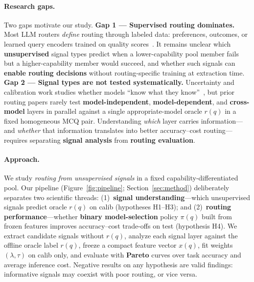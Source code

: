 \paragraph{Research gaps.}
Two gaps motivate our study.
\textbf{Gap 1 --- Supervised routing dominates.}
Most LLM routers \emph{define} routing through labeled data: preferences, outcomes, or learned query encoders trained on quality scores~\citep{ong2024routellm,ding2024hybrid,feng2025graphrouter,zhang2026agentrouter}.
It remains unclear which \textbf{unsupervised} signal types predict when a lower-capability pool member fails but a higher-capability member would succeed, and whether such signals can \textbf{enable routing decisions} without routing-specific training at extraction time.
\textbf{Gap 2 --- Signal types are not tested systematically.}
Uncertainty and calibration work studies whether models ``know what they know''~\citep{kadavath2022know,plaut2024calibration}, but prior routing papers rarely test \textbf{model-independent}, \textbf{model-dependent}, and \textbf{cross-model} layers in parallel against a single appropriate-model oracle $r(q)$ in a fixed homogeneous MCQ pair.
Understanding \emph{which} layer carries information---and \emph{whether} that information translates into better accuracy--cost routing---requires separating \textbf{signal analysis} from \textbf{routing evaluation}.

\paragraph{Approach.}
We study \emph{routing from unsupervised signals} in a fixed capability-differentiated pool.
Our pipeline (Figure~\ref{fig:pipeline}; Section~\ref{sec:method}) deliberately separates two scientific threads:
(1)~\textbf{signal understanding}---which unsupervised signals predict oracle $r(q)$ on calib (hypotheses H1--H3); and
(2)~\textbf{routing performance}---whether \textbf{binary model-selection} policy $\pi(q)$ built from frozen features improves accuracy--cost trade-offs on test (hypothesis H4).
We extract candidate signals without $r(q)$, analyze each signal layer against the offline oracle label $r(q)$, freeze a compact feature vector $x(q)$, fit weights $(\lambda,\tau)$ on calib only, and evaluate with \textbf{Pareto} curves over task accuracy and average inference cost.
Negative results on any hypothesis are valid findings: informative signals may coexist with poor routing, or vice versa.

